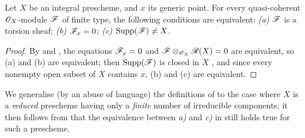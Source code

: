 \begin{proposition}[7.4.6]
\label{I.7.4.6}
Let $X$ be an integral prescheme, and $x$ its generic point.
For every quasi-coherent $\mathscr{O}_X$-module $\mathscr{F}$ of finite type, the following conditions are equivalent: \emph{(a)} $\mathscr{F}$ is a torsion sheaf; \emph{(b)} $\mathscr{F}_x=0$; \emph{(c)} $\operatorname{Supp}(\mathscr{F})\neq X$.
\end{proposition}

\begin{proof}
By  and , the equations $\mathscr{F}_x=0$ and $\mathscr{F}\otimes_{\mathscr{O}_X}\mathscr{R}(X)=0$ are equivalent, so (a) and (b) are equivalent; then $\operatorname{Supp}(\mathscr{F})$ is closed in $X$ , and since every nonempty open subset of $X$ contains $x$, (b) and (c) are equivalent.
\end{proof}

\begin{env}[7.4.7]
\label{I.7.4.7}
We generalise (by an abuse of language) the definitions of  to the case where $X$ is a \emph{reduced} prescheme having only a \emph{finite} number of irreducible components; it then follows from  that the equivalence between \emph{a)} and \emph{c)} in  still holds true for such a prescheme.
\end{env}

